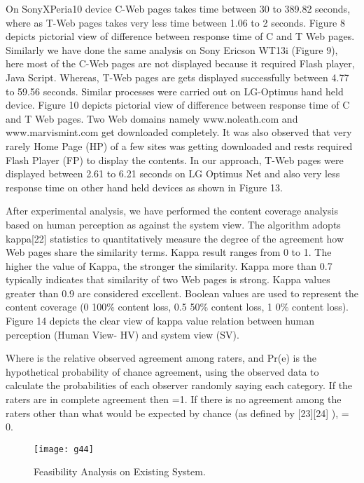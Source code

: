 \documentclass[fleqn,twoside]{article}
\begin{document}
On SonyXPeria10 device C-Web pages takes time between 30 to 389.82 seconds, where as T-Web pages takes very less time between 1.06 to 2 seconds. Figure 8 depicts pictorial view of difference between response time of C and T Web pages. Similarly we have done the same analysis on Sony Ericson WT13i (Figure 9), here most of the C-Web pages are not displayed because it required Flash player, Java Script. Whereas, T-Web pages are gets displayed successfully between 4.77 to 59.56 seconds. Similar processes were carried out on LG-Optimus hand held device. Figure 10 depicts pictorial view of difference between response time of C and T Web pages. Two Web domains namely www.noleath.com and www.marvismint.com  get downloaded completely. It was also observed that very rarely Home Page (HP) of a few sites was getting downloaded and rests required Flash Player (FP) to display the contents. In our approach, T-Web pages were displayed between 2.61 to 6.21 seconds on LG Optimus Net and also very less response time on other hand held devices as shown in Figure 13. 

\vskip 2mm
After experimental analysis, we have performed the content coverage analysis based on human perception as against the system view. The algorithm adopts kappa[22] statistics to quantitatively measure the degree of the agreement how Web pages share the similarity terms. Kappa result ranges from 0 to 1. The higher the value of Kappa, the stronger the similarity. Kappa more than 0.7 typically indicates that similarity of two Web pages is strong. Kappa values greater than 0.9 are considered excellent. Boolean values are used to represent the content coverage (0 100\% content loss, 0.5  50\% content loss, 1  0\% content loss). Figure 14 depicts the clear view of kappa value relation between human perception (Human View- HV) and system view (SV). 		




Where  is the relative observed agreement among raters, and Pr(e) is the hypothetical probability of chance agreement, using the observed data to calculate the probabilities of each observer randomly saying each category. If the raters are in complete agreement then =1. If there is no agreement among the raters other than what would be expected by chance (as defined by [23][24] ),  = 0.
\begin{figure*}[!htbp]
\centering
\begin{center}
\texttt{[image: g44]}
\caption{Feasibility Analysis on Existing System.}
\end{center}
\end{figure*}
\end{document}
